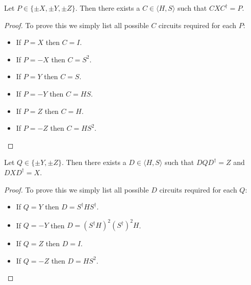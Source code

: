 \documentclass[12pt]{dalthesis}
\begin{document}
\begin{lemma}
\label{ConjX}
Let $P \in \{\pm X, \pm Y, \pm Z \}$. Then there exists a $C \in \langle H, S \rangle$ such that $CXC^\dag = P$.
\end{lemma}
\begin{proof}
To prove this we simply list all possible $C$ circuits required for each $P$:
\begin{itemize}
\item If $P = X$ then $C = I$.
\item If $P = -X$ then $C = S^2$.
\item If $P = Y$ then $C = S$.
\item If $P = -Y$ then $C = HS$.
\item If $P = Z$ then $C = H$.
\item If $P = -Z$ then $C = HS^2$.
\end{itemize}
\end{proof}

\begin{lemma}
\label{ConjZ}
Let $Q \in \{\pm Y, \pm Z \}$. Then there exists a $D \in \langle H, S \rangle$ such that $DQD^\dag = Z$ and $DXD^\dag = X$.
\end{lemma}
\begin{proof}
To prove this we simply list all possible $D$ circuits required for each $Q$:
\begin{itemize}
\item If $Q = Y$ then $D = S^\dag HS^\dag$.
\item If $Q = -Y$ then $D = (S^\dag H)^2 (S^\dag)^2 H$.
\item If $Q = Z$ then $D = I$.
\item If $Q = -Z$ then $D = HS^2$.
\end{itemize}
\end{proof}
\end{document}
